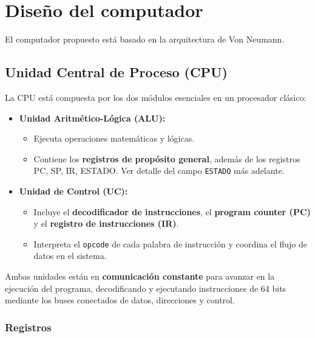 \documentclass{article}
\begin{document}

\section{Diseño del computador}

El computador propuesto está basado en la arquitectura de Von Neumann.

\subsection{Unidad Central de Proceso (CPU)}

La CPU está compuesta por los dos módulos esenciales en un procesador clásico:

\begin{itemize}
    \item \textbf{Unidad Aritmético-Lógica (ALU):}
    \begin{itemize}
        \item Ejecuta operaciones matemáticas y lógicas.
        \item Contiene los \textbf{registros de propósito general}, además de los registros PC, SP, IR, ESTADO. Ver detalle del campo \texttt{ESTADO} más adelante.
    \end{itemize}
    \item \textbf{Unidad de Control (UC):}
    \begin{itemize}
        \item Incluye el \textbf{decodificador de instrucciones}, el \textbf{program counter (PC)} y el \textbf{registro de instrucciones (IR)}.
        \item Interpreta el \texttt{opcode} de cada palabra de instrucción y coordina el flujo de datos en el sistema.
    \end{itemize}
\end{itemize}

Ambas unidades están en \textbf{comunicación constante} para avanzar en la ejecución del programa, decodificando y ejecutando instrucciones de 64 bits mediante los buses conectados de datos, direcciones y control.

\subsubsection{Registros}
\end{document}
